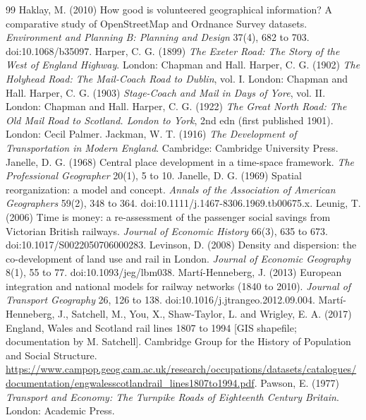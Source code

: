 \begin{thebibliography}{99}
 Haklay, M. (2010) How good is volunteered geographical information? A comparative study of OpenStreetMap and Ordnance Survey datasets. \textit{Environment and Planning B: Planning and Design} 37(4), 682 to 703. doi:10.1068/b35097.
 Harper, C. G. (1899) \textit{The Exeter Road: The Story of the West of England Highway}. London: Chapman and Hall.
 Harper, C. G. (1902) \textit{The Holyhead Road: The Mail-Coach Road to Dublin}, vol. I. London: Chapman and Hall.
 Harper, C. G. (1903) \textit{Stage-Coach and Mail in Days of Yore}, vol. II. London: Chapman and Hall.
 Harper, C. G. (1922) \textit{The Great North Road: The Old Mail Road to Scotland. London to York}, 2nd edn (first published 1901). London: Cecil Palmer.
 Jackman, W. T. (1916) \textit{The Development of Transportation in Modern England}. Cambridge: Cambridge University Press.
 Janelle, D. G. (1968) Central place development in a time-space framework. \textit{The Professional Geographer} 20(1), 5 to 10.
 Janelle, D. G. (1969) Spatial reorganization: a model and concept. \textit{Annals of the Association of American Geographers} 59(2), 348 to 364. doi:10.1111/j.1467-8306.1969.tb00675.x.
 Leunig, T. (2006) Time is money: a re-assessment of the passenger social savings from Victorian British railways. \textit{Journal of Economic History} 66(3), 635 to 673. doi:10.1017/S0022050706000283.
 Levinson, D. (2008) Density and dispersion: the co-development of land use and rail in London. \textit{Journal of Economic Geography} 8(1), 55 to 77. doi:10.1093/jeg/lbm038.
 Mart\'i-Henneberg, J. (2013) European integration and national models for railway networks (1840 to 2010). \textit{Journal of Transport Geography} 26, 126 to 138. doi:10.1016/j.jtrangeo.2012.09.004.
 Mart\'i-Henneberg, J., Satchell, M., You, X., Shaw-Taylor, L. and Wrigley, E. A. (2017) England, Wales and Scotland rail lines 1807 to 1994 [GIS shapefile; documentation by M. Satchell]. Cambridge Group for the History of Population and Social Structure. \url{https://www.campop.geog.cam.ac.uk/research/occupations/datasets/catalogues/documentation/engwalesscotlandrail_lines1807to1994.pdf}.
 Pawson, E. (1977) \textit{Transport and Economy: The Turnpike Roads of Eighteenth Century Britain}. London: Academic Press.

\end{thebibliography}
